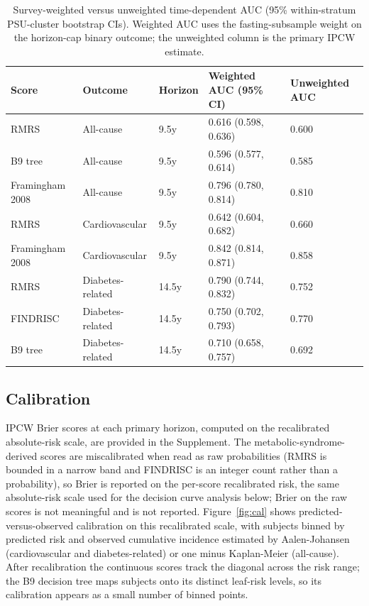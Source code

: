 \documentclass[11pt]{article}
\begin{document}
\begin{table}[h]
\centering
\caption{Survey-weighted versus unweighted time-dependent AUC (95\% within-stratum PSU-cluster bootstrap CIs). Weighted AUC uses the fasting-subsample weight on the horizon-cap binary outcome; the unweighted column is the primary IPCW estimate.}
\label{tab:wauc}
\begin{tabular}{lllll}
\toprule
Score & Outcome & Horizon & Weighted AUC (95\% CI) & Unweighted AUC \\
\midrule
RMRS & All-cause & 9.5y & 0.616 (0.598, 0.636) & 0.600 \\
B9 tree & All-cause & 9.5y & 0.596 (0.577, 0.614) & 0.585 \\
Framingham 2008 & All-cause & 9.5y & 0.796 (0.780, 0.814) & 0.810 \\
RMRS & Cardiovascular & 9.5y & 0.642 (0.604, 0.682) & 0.660 \\
Framingham 2008 & Cardiovascular & 9.5y & 0.842 (0.814, 0.871) & 0.858 \\
RMRS & Diabetes-related & 14.5y & 0.790 (0.744, 0.832) & 0.752 \\
FINDRISC & Diabetes-related & 14.5y & 0.750 (0.702, 0.793) & 0.770 \\
B9 tree & Diabetes-related & 14.5y & 0.710 (0.658, 0.757) & 0.692 \\
\bottomrule
\end{tabular}
\end{table}

\subsection*{Calibration}

IPCW Brier scores at each primary horizon, computed on the recalibrated absolute-risk scale, are provided in the Supplement. The metabolic-syndrome-derived scores are miscalibrated when read as raw probabilities (RMRS is bounded in a narrow band and FINDRISC is an integer count rather than a probability), so Brier is reported on the per-score recalibrated risk, the same absolute-risk scale used for the decision curve analysis below; Brier on the raw scores is not meaningful and is not reported. Figure~\ref{fig:cal} shows predicted-versus-observed calibration on this recalibrated scale, with subjects binned by predicted risk and observed cumulative incidence estimated by Aalen-Johansen (cardiovascular and diabetes-related) or one minus Kaplan-Meier (all-cause). After recalibration the continuous scores track the diagonal across the risk range; the B9 decision tree maps subjects onto its distinct leaf-risk levels, so its calibration appears as a small number of binned points.
\end{document}
